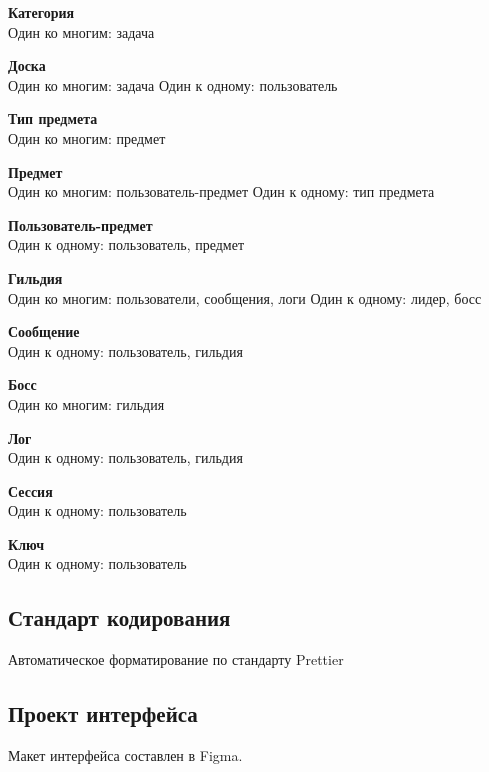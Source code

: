 \documentclass[../document.tex]{subfiles}
\begin{document}
\par \textbf{Категория}\\
Один ко многим: задача

\par \textbf{Доска}\\
Один ко многим: задача
Один к одному: пользователь

\par \textbf{Тип предмета}\\
Один ко многим: предмет

\par \textbf{Предмет}\\
Один ко многим: пользователь-предмет
Один к одному: тип предмета

\par \textbf{Пользователь-предмет}\\
Один к одному: пользователь, предмет

\par \textbf{Гильдия}\\
Один ко многим: пользователи, сообщения, логи
Один к одному: лидер, босс

\par \textbf{Сообщение}\\
Один к одному: пользователь, гильдия

\par \textbf{Босс}\\
Один ко многим: гильдия

\par \textbf{Лог}\\
Один к одному: пользователь, гильдия

\par \textbf{Сессия}\\
Один к одному: пользователь

\par \textbf{Ключ}\\
Один к одному: пользователь

\subsection{Стандарт кодирования}
\par Автоматическое форматирование по стандарту Prettier
\subsection{Проект интерфейса}
\par Макет интерфейса составлен в Figma.
\end{document}
